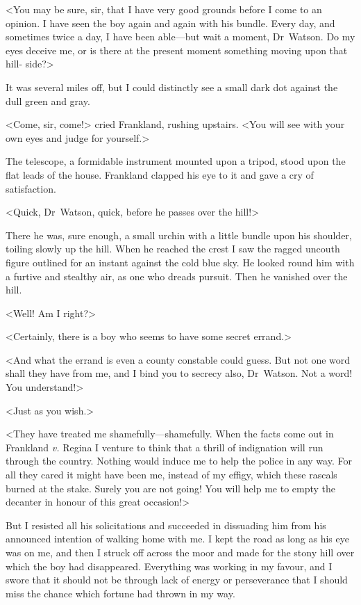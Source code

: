 <You may be sure, sir, that I have very good grounds before I come to an opinion. I have seen the boy again and again with his bundle. Every day, and sometimes twice a day, I have been able—but wait a moment, Dr~Watson. Do my eyes deceive me, or is there at the present moment something moving upon that hill- side?>

It was several miles off, but I could distinctly see a small dark dot against the dull green and gray.

<Come, sir, come!> cried Frankland, rushing upstairs. <You will see with your own eyes and judge for yourself.>

The telescope, a formidable instrument mounted upon a tripod, stood upon the flat leads of the house. Frankland clapped his eye to it and gave a cry of satisfaction.

<Quick, Dr~Watson, quick, before he passes over the hill!>

There he was, sure enough, a small urchin with a little bundle upon his shoulder, toiling slowly up the hill. When he reached the crest I saw the ragged uncouth figure outlined for an instant against the cold blue sky. He looked round him with a furtive and stealthy air, as one who dreads pursuit. Then he vanished over the hill.

<Well! Am I right?>

<Certainly, there is a boy who seems to have some secret errand.>

<And what the errand is even a county constable could guess. But not one word shall they have from me, and I bind you to secrecy also, Dr~Watson. Not a word! You understand!>

<Just as you wish.>

<They have treated me shamefully—shamefully. When the facts come out in Frankland \textit{v.} Regina I venture to think that a thrill of indignation will run through the country. Nothing would induce me to help the police in any way. For all they cared it might have been me, instead of my effigy, which these rascals burned at the stake. Surely you are not going! You will help me to empty the decanter in honour of this great occasion!>

But I resisted all his solicitations and succeeded in dissuading him from his announced intention of walking home with me. I kept the road as long as his eye was on me, and then I struck off across the moor and made for the stony hill over which the boy had disappeared. Everything was working in my favour, and I swore that it should not be through lack of energy or perseverance that I should miss the chance which fortune had thrown in my way.


